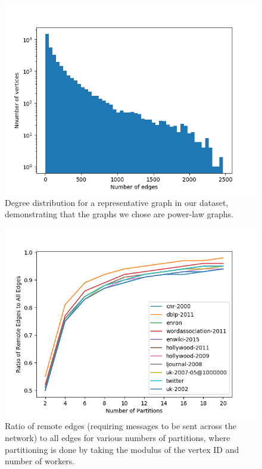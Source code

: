 \begin{figure}
	\centering
	\includegraphics[width=\columnwidth]{../good_plots/degree_distribution_10_mil.png}
	\caption{Degree distribution for a representative graph in our dataset, 
	demonstrating that the graphs we chose are power-law graphs.}
	\label{fig:degree_distribution}
\end{figure}

\begin{figure}
	\centering
	\includegraphics[width=\columnwidth]{../good_plots/remote_to_all_modulo.png}
	\caption{Ratio of remote edges (requiring messages to be sent across the 
	network) to all edges for various numbers of partitions, where partitioning 
	is done by taking the modulus of the vertex ID and number of workers.}
	\label{fig:remote_to_all_mod}
\end{figure}

